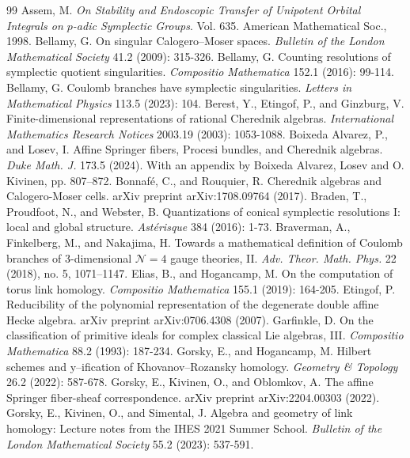 \documentclass{amsart}
\numberwithin{equation}{section}
\theoremstyle{definition}
\newcommand{\cN}{\mathcal{N}}
\begin{document}
\begin{thebibliography}{99}
     Assem, M. \textit{On Stability and Endoscopic Transfer of Unipotent Orbital Integrals on $ p $-adic Symplectic Groups}. Vol. 635. American Mathematical Soc., 1998.
     Bellamy, G. On singular Calogero–Moser spaces. \textit{Bulletin of the London Mathematical Society} 41.2 (2009): 315-326.
     Bellamy, G. Counting resolutions of symplectic quotient singularities. \textit{Compositio Mathematica} 152.1 (2016): 99-114.
     Bellamy, G. Coulomb branches have symplectic singularities. \textit{Letters in Mathematical Physics} 113.5 (2023): 104.
     Berest, Y., Etingof, P., and Ginzburg, V. Finite-dimensional representations of rational Cherednik algebras. \textit{International Mathematics Research Notices} 2003.19 (2003): 1053-1088.
     Boixeda Alvarez, P., and Losev, I. Affine Springer fibers, Procesi bundles, and Cherednik algebras. \textit{Duke Math. J.} 173.5 (2024). With an appendix by Boixeda Alvarez, Losev and O. Kivinen, pp. 807–872.
     Bonnaf\'e, C., and Rouquier, R. Cherednik algebras and Calogero-Moser cells. arXiv preprint arXiv:1708.09764 (2017).
     Braden, T., Proudfoot, N., and Webster, B. Quantizations of conical symplectic resolutions I: local and global structure. \textit{Astérisque} 384 (2016): 1-73.
     Braverman, A., Finkelberg, M., and Nakajima, H. Towards a mathematical definition of Coulomb branches of 3-dimensional $\cN = 4$ gauge theories, II. \textit{Adv. Theor. Math. Phys.} 22 (2018), no. 5, 1071–1147.
     Elias, B., and Hogancamp, M. On the computation of torus link homology. \textit{Compositio Mathematica} 155.1 (2019): 164-205.
     Etingof, P. Reducibility of the polynomial representation of the degenerate double affine Hecke algebra. arXiv preprint arXiv:0706.4308 (2007).
     Garfinkle, D. On the classification of primitive ideals for complex classical Lie algebras, III. \textit{Compositio Mathematica} 88.2 (1993): 187-234.
     Gorsky, E., and Hogancamp, M. Hilbert schemes and y–ification of Khovanov–Rozansky homology. \textit{Geometry \& Topology} 26.2 (2022): 587-678.
     Gorsky, E., Kivinen, O., and Oblomkov, A. The affine Springer fiber-sheaf correspondence. arXiv preprint arXiv:2204.00303 (2022).
     Gorsky, E., Kivinen, O., and Simental, J. Algebra and geometry of link homology: Lecture notes from the IHES 2021 Summer School. \textit{Bulletin of the London Mathematical Society} 55.2 (2023): 537-591.

\end{thebibliography}
\end{document}

